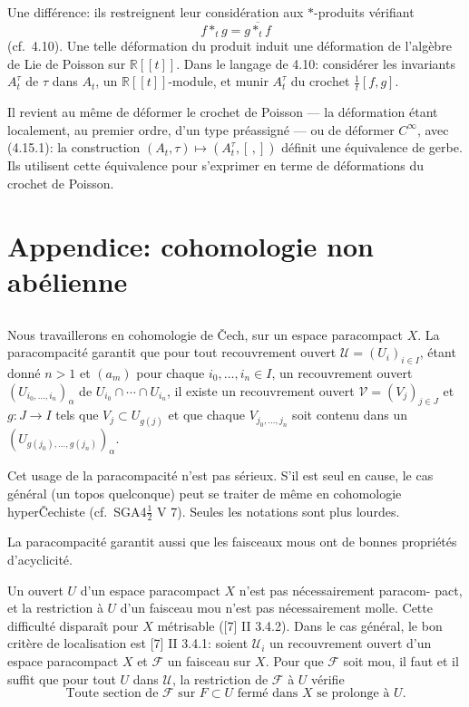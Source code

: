 \documentclass[11pt,a4paper]{article}
\theoremstyle{plain}
\theoremstyle{definition}
\newcommand{\R}{\mathbb{R}}
\begin{document}
Une diff\'erence: ils restreignent leur consid\'eration aux $*$-produits v\'erifiant
\begin{equation}
f *_{t} g = \overline{g *_{t} f} \tag{4.15.1}
\end{equation}
(cf.~4.10). Une telle d\'eformation du produit induit une d\'eformation de l'alg\`ebre de
Lie de Poisson sur $\R[[t]]$. Dans le langage de 4.10: consid\'erer les invariants $A_{t}^{\tau}$ de
$\tau$ dans $A_{t}$, un $\R[[t]]$-module, et munir $A_{t}^{\tau}$ du crochet $\tfrac{1}{t}[f,g]$.

Il revient au m\^eme de d\'eformer le crochet de Poisson --- la d\'eformation \'etant localement, au premier ordre, d'un type pr\'eassign\'e --- ou de d\'eformer $C^{\infty}$, avec (4.15.1):
la construction $(A_{t}, \tau) \mapsto (A_{t}^{\tau}, [\,,])$ d\'efinit une \'equivalence de gerbe. Ils utilisent
cette \'equivalence pour s'exprimer en terme de d\'eformations du crochet de Poisson.

\section*{Appendice: cohomologie non ab\'elienne}

\subsection{}
Nous travaillerons en cohomologie de \v{C}ech, sur un espace paracompact $X$.
La paracompacit\'e garantit que pour tout recouvrement ouvert $\mathcal{U} = (U_{i})_{i \in I}$, \'etant
donn\'e $n > 1$ et $(a_{m})$ pour chaque $i_{0}, \ldots, i_{n} \in I$, un recouvrement ouvert $(U_{i_{0}, \ldots, i_{n}})_{\alpha}$ de $U_{i_{0}} \cap \cdots \cap U_{i_{n}}$, il existe un recouvrement ouvert $\mathcal{V} = (V_{j})_{j \in J}$ et $g: J \to I$ tels que $V_{j} \subset U_{g(j)}$
et que chaque $V_{j_{0}, \ldots, j_{n}}$ soit contenu dans un $(U_{g(j_{0}), \ldots, g(j_{n})})_{\alpha}$.

Cet usage de la paracompacit\'e n'est pas s\'erieux. S'il est seul en cause, le cas
g\'en\'eral (un topos quelconque) peut se traiter de m\^eme en cohomologie hyper\v{C}echiste
(cf.~SGA4$\tfrac{1}{2}$ V 7). Seules les notations sont plus lourdes.

La paracompacit\'e garantit aussi que les faisceaux mous ont de bonnes propri\'et\'es d'acyclicit\'e.

Un ouvert $U$ d'un espace paracompact $X$ n'est pas n\'ecessairement paracom-
pact, et la restriction \`a $U$ d'un faisceau mou n'est pas n\'ecessairement molle. Cette difficult\'e dispara\^it pour $X$ m\'etrisable ([7] II 3.4.2). Dans le cas g\'en\'eral, le bon crit\`ere de localisation est [7] II 3.4.1: soient $\mathcal{U}_{i}$ un recouvrement ouvert d'un espace
paracompact $X$ et $\mathcal{F}$ un faisceau sur $X$. Pour que $\mathcal{F}$ soit mou, il faut et il suffit
que pour tout $U$ dans $\mathcal{U}$, la restriction de $\mathcal{F}$ \`a $U$ v\'erifie
\[
\text{Toute section de } \mathcal{F} \text{ sur } F \subset U \text{ ferm\'e dans } X \text{ se prolonge \`a } U. \tag{A.1.1}
\]
\end{document}
